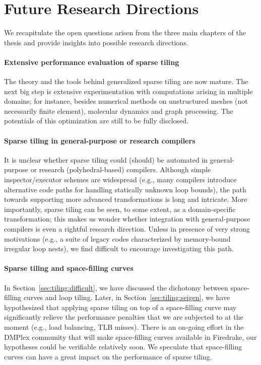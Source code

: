\section{Future Research Directions}
We recapitulate the open questions arisen from the three main chapters of the thesis and provide insights into possible research directions. 

\paragraph{Extensive performance evaluation of sparse tiling}
The theory and the tools behind generalized sparse tiling are now mature. The next big step is extensive experimentation with computations arising in multiple domains; for instance, besides numerical methods on unstructured meshes (not necessarily finite element), molecular dynamics and graph processing. The potentials of this optimization are still to be fully disclosed. 

\paragraph{Sparse tiling in general-purpose or research compilers}
It is unclear whether sparse tiling could (should) be automated in general-purpose or research (polyhedral-based) compilers. Although simple inspector/executor schemes are widespread (e.g., many compilers introduce alternative code paths for handling statically unknown loop bounds), the path towards supporting more advanced transformations is long and intricate. More importantly, sparse tiling can be seen, to some extent, as a domain-specific transformation; this makes us wonder whether integration with general-purpose compilers is even a rightful research direction. Unless in presence of very strong motivations (e.g., a suite of legacy codes characterized by memory-bound irregular loop nests), we find difficult to encourage investigating this path.

\paragraph{Sparse tiling and space-filling curves}
In Section~\ref{sec:tiling:difficult}, we have discussed the dichotomy between space-filling curves and loop tiling. Later, in Section~\ref{sec:tiling:seigen}, we have hypothesized that applying sparse tiling on top of a space-filling curve may significantly relieve the performance penalties that we are subjected to at the moment (e.g., load balancing, TLB misses). There is an on-going effort in the DMPlex community that will make space-filling curves available in Firedrake, our hypotheses could be verifiable relatively soon. We speculate that space-filling curves can have a great impact on the performance of sparse tiling.


